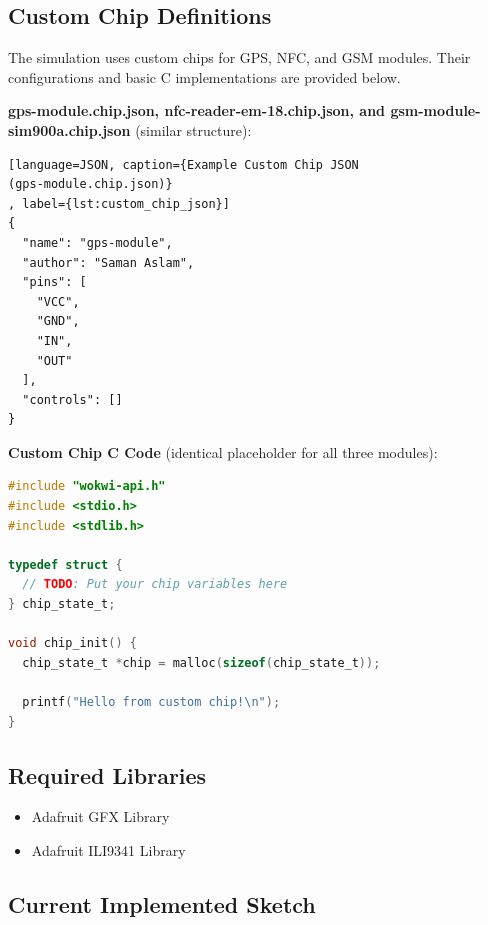 \subsection{Custom Chip Definitions}

The simulation uses custom chips for GPS, NFC, and GSM modules. Their configurations and basic C implementations are provided below.

\textbf{gps-module.chip.json, nfc-reader-em-18.chip.json, and gsm-module-sim900a.chip.json} (similar structure):

\begin{lstlisting}
[language=JSON, caption={Example Custom Chip JSON 
(gps-module.chip.json)}
, label={lst:custom_chip_json}]
{
  "name": "gps-module",
  "author": "Saman Aslam",
  "pins": [
    "VCC",
    "GND",
    "IN",
    "OUT"
  ],
  "controls": []
}
\end{lstlisting}

\textbf{Custom Chip C Code} (identical placeholder for all three modules):

\begin{lstlisting}[language=C, caption={Custom Chip C Implementation (e.g., gps-module.chip.c)}, label={lst:custom_chip_c}]
#include "wokwi-api.h"
#include <stdio.h>
#include <stdlib.h>

typedef struct {
  // TODO: Put your chip variables here
} chip_state_t;

void chip_init() {
  chip_state_t *chip = malloc(sizeof(chip_state_t));

  printf("Hello from custom chip!\n");
}
\end{lstlisting}

\subsection{Required Libraries}

\begin{itemize}
    \item Adafruit GFX Library
    \item Adafruit ILI9341 Library
\end{itemize}

\subsection{Current Implemented Sketch}

